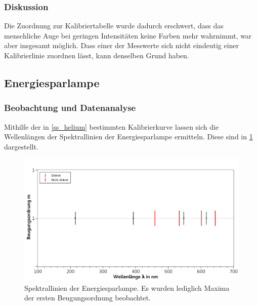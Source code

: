 \documentclass[
	a4paper,
	12pt,
	pagesize,
	ngerman
]{scrartcl}
\begin{document}
	\subsubsection{Diskussion}
	Die Zuordnung zur Kalibriertabelle wurde dadurch erschwert, dass das menschliche Auge bei geringen Intensitäten keine Farben mehr wahrnimmt, war aber insgesamt möglich.
	Dass einer der Messwerte sich nicht eindeutig einer Kalibrierlinie zuordnen lässt, kann denselben Grund haben.
	
	\subsection{Energiesparlampe}
	\subsubsection{Beobachtung und Datenanalyse}
	Mithilfe der in \cref{ss_helium} bestimmten Kalibrierkurve lassen sich die Wellenlängen der Spektrallinien der Energiesparlampe ermitteln.
	Diese sind in \cref{fig_spar} dargestellt.


	\begin{figure}[H] 
		\includegraphics[width=1\textwidth]{fig_spar} 
		\centering
		\caption{Spektrallinien der Energiesparlampe. 
		Es wurden lediglich Maxima der ersten Beugungsordnung beobachtet. %
		}
		\label{fig_spar}
		\centering
	\end{figure}
	
\end{document}

